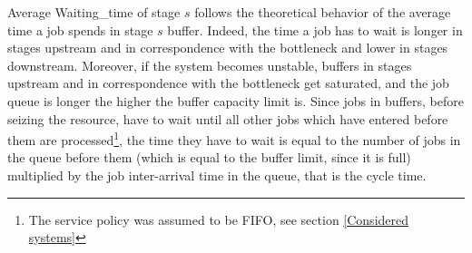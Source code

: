Average Waiting\_time of stage $s$ follows the theoretical behavior of the average time a job spends in stage $s$ buffer. Indeed, the time a job has to wait is longer in stages upstream and in correspondence with the bottleneck and lower in stages downstream. Moreover, if the system becomes unstable, buffers in stages upstream and in correspondence with the bottleneck get saturated, and the job queue is longer the higher the buffer capacity limit is. Since jobs in buffers, before seizing the resource, have to wait until all other jobs which have entered before them are processed\footnote{The service policy was assumed to be FIFO, see section \ref{Considered systems}}, the time they have to wait is equal to the number of jobs in the queue before them (which is equal to the buffer limit, since it is full) multiplied by the job inter-arrival time in the queue, that is the cycle time.
